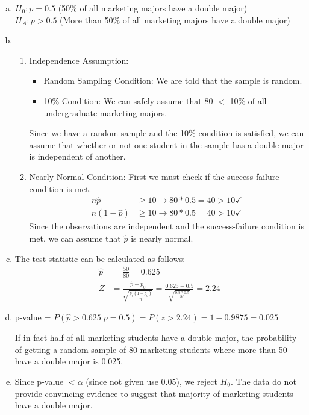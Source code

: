 {
\begin{enumerate}[(a)]
\item $H_0: p = 0.5$ (50\% of all marketing majors have a double major) \\
$H_A: p > 0.5$ (More than 50\% of all marketing majors have a double major)

\item
\begin{enumerate}[1.]
\item Independence Assumption: 
\begin{itemize}
\item Random Sampling Condition: We are told that the sample is random.
\item 10\% Condition: We can safely assume that $80$ $<$ 10\% of all undergraduate marketing majors.
\end{itemize}
Since we have a random sample and the 10\% condition is satisfied, we can assume that whether or not one student in the sample has a double major is independent of another.
\item Nearly Normal Condition: First we must check if the success failure condition is met.
\begin{align*}
n\hat{p} &\ge 10 \rightarrow 80 * 0.5 = 40 > 10 \checkmark \\
n(1 - \hat{p}) &\ge 10 \rightarrow 80 * 0.5 = 40 > 10 \checkmark
\end{align*}
Since the observations are independent and the success-failure condition is met, we can assume that $\hat{p}$ is nearly normal.
\end{enumerate}

\item The test statistic can be calculated as follows:
\begin{align*}
\hat{p} &= \frac{50}{80} = 0.625 \\
Z &= \frac{\hat{p} - p_0}{\sqrt{\frac{p_0 (1 - p_0)}{n}}} = \frac{0.625 - 0.5}{\sqrt{\frac{0.5 * 0.5}{80}}} = 2.24
\end{align*}

\item p-value = $P(\hat{p} > 0.625 | p = 0.5) = P(z > 2.24) = 1 - 0.9875 = 0.025$

If in fact half of all marketing students have a double major, the probability of getting a random sample of 80 marketing students where more than 50 have a double major is 0.025.
 
\item Since p-value $< \alpha$ (since not given use 0.05), we reject $H_0$. The data do not provide convincing evidence to suggest that majority of marketing students have a double major.
\end{enumerate}
}\label{DoubleMajor}

